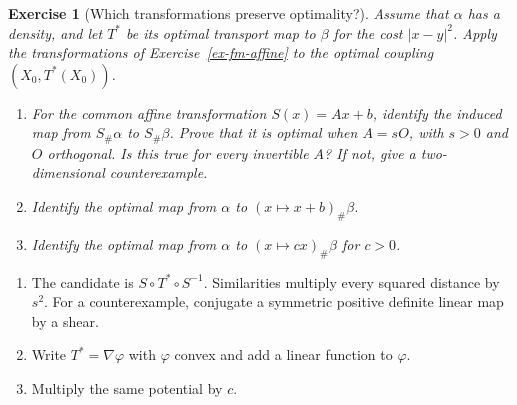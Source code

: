 \documentclass[11pt,a4paper]{article}
\theoremstyle{exostyle}
\newtheorem{exercise}{Exercise}
\newcommand{\push}{\#}
\begin{document}
\begin{exercise}[Which transformations preserve optimality?]\label{ex-fm-optimality}
Assume that $\alpha$ has a density, and let $T^*$ be its optimal transport
map to $\beta$ for the cost $|x-y|^2$. Apply the transformations of
Exercise~\ref{ex-fm-affine} to the optimal coupling $(X_0,T^*(X_0))$.
\begin{enumerate}[label=(\alph*)]
\item For the common affine transformation $S(x)=Ax+b$, identify the
  induced map from $S_\push\alpha$ to $S_\push\beta$. Prove that it is
  optimal when $A=sO$, with $s>0$ and $O$ orthogonal. Is this true for
  every invertible $A$? If not, give a two-dimensional counterexample.
\item Identify the optimal map from $\alpha$ to $(x\mapsto x+b)_\push\beta$.
\item Identify the optimal map from $\alpha$ to $(x\mapsto cx)_\push\beta$
  for $c>0$.
\end{enumerate}
\end{exercise}
\begin{hints}
\begin{enumerate}[label=(\alph*)]
\item The candidate is $S\circ T^*\circ S^{-1}$. Similarities multiply
  every squared distance by $s^2$. For a counterexample, conjugate a
  symmetric positive definite linear map by a shear.
\item Write $T^*=\nabla\varphi$ with $\varphi$ convex and add a linear
  function to $\varphi$.
\item Multiply the same potential by $c$.
\end{enumerate}
\end{hints}
\end{document}
